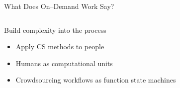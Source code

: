 \documentclass[presentation]{subfiles}
\begin{document}
\begin{frame}{What Does On--Demand Work Say?}
  \begin{columns}
    \begin{column}{0.6\textwidth}
      Build complexity into the process
      \begin{itemize}
        \item<+-> Apply CS methods to people\par
                 \scriptsize{\textcite{crowdForgeKittur}\par}\normalsize{}
        \item<+-> Humans as computational units\par
                 \scriptsize{\textcite{Lasecki:2014:LSR:2661334.2661352}\par}\normalsize{}
        \item<+-> Crowdsourcing workflows as function state machines\par
                 \scriptsize{\textcite{latoza2014microtask}\par}\normalsize{}
      \end{itemize}
    \end{column}
    
    \begin{column}{0.4\textwidth}
      

\end{column}
\end{columns}
\end{frame}
\end{document}
